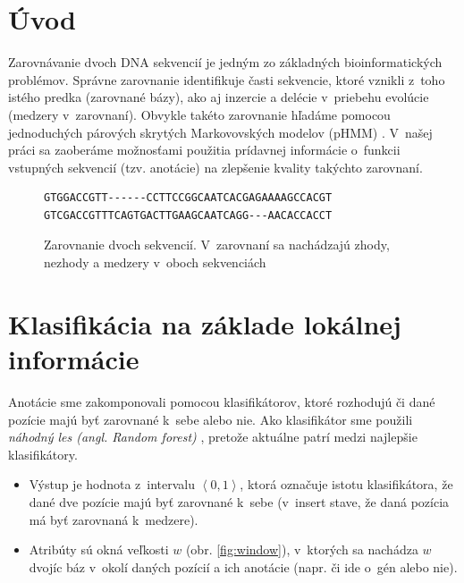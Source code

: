 \documentclass[myposter,portrait]{sciposter}
\def\mysection#1{
{\color{SectionCol}\section*{\sc\bfseries #1}}}
\begin{document}
\begin{multicols*}{3}


\mysection{Úvod}

Zarovnávanie dvoch DNA sekvencií je jedným zo základných
bioinformatických problémov. Správne zarovnanie identifikuje časti
sekvencie, ktoré vznikli z~toho istého predka (zarovnané bázy), ako aj
inzercie a delécie v~priebehu evolúcie (medzery v~zarovnaní). Obvykle
takéto zarovnanie hľadáme pomocou jednoduchých párových skrytých
Markovovských modelov (pHMM) \cite{durbin}. V~našej práci \cite{hozzaThesis} sa zaoberáme
možnosťami použitia prídavnej informácie o~funkcii vstupných sekvencií
(tzv. anotácie) na zlepšenie kvality takýchto zarovnaní.


\begin{figure}[hbtp]
    \centering
    \begin{BVerbatim}
GTGGACCGTT------CCTTCCGGCAATCACGAGAAAAGCCACGT
GTCGACCGTTTCAGTGACTTGAAGCAATCAGG---AACACCACCT
    \end{BVerbatim}
    \caption{Zarovnanie dvoch sekvencií. V~zarovnaní sa nachádzajú zhody, nezhody a medzery v~oboch sekvenciách}
    \label{fig:alignment_example}
\end{figure}

\mysection{Klasifikácia na základe lokálnej informácie}

Anotácie sme zakomponovali pomocou klasifikátorov, ktoré rozhodujú či dané pozície majú byť zarovnané k~sebe alebo nie. Ako klasifikátor sme použili \emph{náhodný les (angl. Random forest)} \cite{randomForestPaper}, pretože aktuálne patrí medzi najlepšie klasifikátory.

\begin{itemize}
    \item Výstup je hodnota z~intervalu $\left<0,1\right>$, ktorá označuje istotu klasifikátora, že dané dve pozície majú byť zarovnané k~sebe (v~insert stave, že daná pozícia má byť zarovnaná k~medzere).
    \item Atribúty sú okná veľkosti $w$ (obr. \ref{fig:window}), v~ktorých sa nachádza $w$ dvojíc báz v~okolí daných pozícií a ich anotácie (napr. či ide o~gén alebo nie).
\end{itemize}


\end{multicols*}
\end{document}
